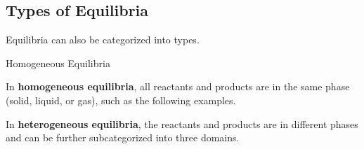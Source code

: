 \documentclass[10pt]{article}
\begin{document}
  \subsection{Types of Equilibria}

    Equilibria can also be categorized into types.

    \begin{core}{Homogeneous Equilibria}
      
      In \textbf{homogeneous equilibria}, all reactants and products are in the same phase (solid, liquid, or gas), such as the following examples.




    \end{core}
    
    In \textbf{heterogeneous equilibria}, the reactants and products are in different phases and can be further subcategorized into three domains.  
\end{document}
